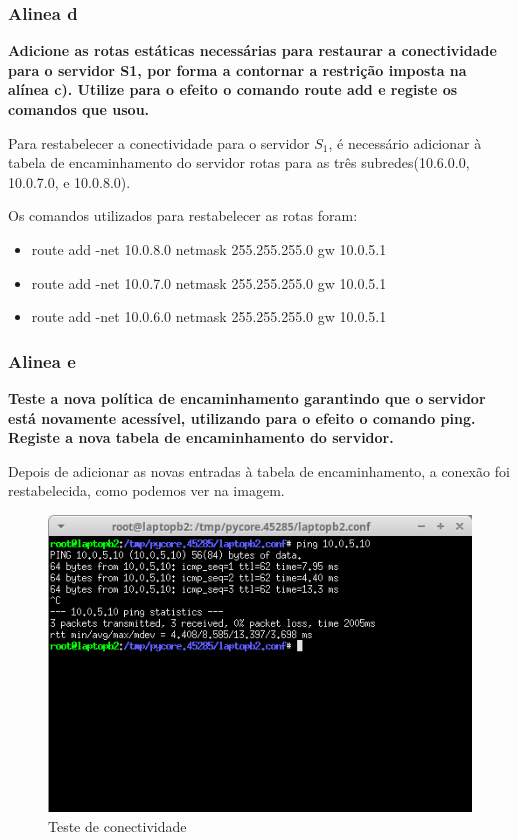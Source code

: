 \documentclass{article}
\begin{document}
\subsubsection{Alinea d}
\textbf{Adicione as rotas estáticas necessárias para restaurar a conectividade para o servidor S1, por forma a contornar a restrição imposta na alínea c). Utilize para o efeito   o comando route add e registe os comandos que usou.}\\\par
Para restabelecer a conectividade para o servidor $S_1$, é necessário adicionar à tabela de encaminhamento do servidor rotas para as três subredes(10.6.0.0, 10.0.7.0, e 10.0.8.0).\par
Os comandos utilizados para restabelecer as rotas foram:
\begin{itemize}
	\item route add -net 10.0.8.0 netmask 255.255.255.0 gw 10.0.5.1
	\item route add -net 10.0.7.0 netmask 255.255.255.0 gw 10.0.5.1
	\item route add -net 10.0.6.0 netmask 255.255.255.0 gw 10.0.5.1
\end{itemize} 

\subsubsection{Alinea e}
\textbf{Teste a nova política de encaminhamento garantindo que o servidor está novamente acessível, utilizando para o efeito o comando ping. Registe a nova tabela de encaminhamento do servidor.}\\\par
Depois de adicionar as novas entradas à tabela de encaminhamento, a conexão foi restabelecida, como podemos ver na imagem.\\

\begin{figure}[h]
	\centering
	\includegraphics[scale = 0.6]{conectividade-ex2e.png}
	\caption{Teste de conectividade}
\end{figure}
\end{document}
